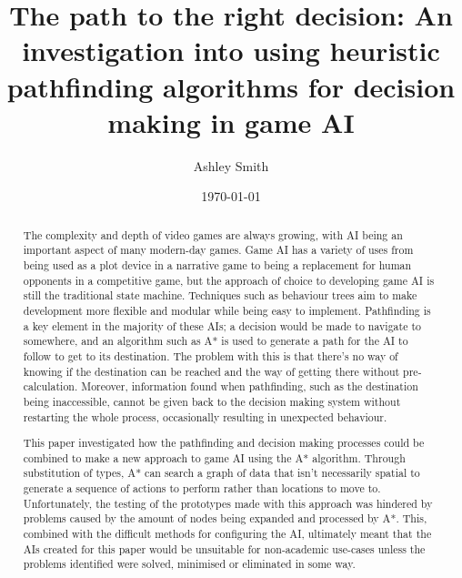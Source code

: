 \documentclass[11pt, a4paper]{report}
\begin{document}
\title{\titlefont The path to the right decision: An investigation into using heuristic pathfinding algorithms for decision making in game AI}
\author{Ashley Smith}
\date{\today}
\maketitle
\thispagestyle{empty}

\renewcommand\abstractname{\textbf{Abstract}}
\begin{abstract}
The complexity and depth of video games are always growing, with AI being an important aspect of many modern-day games. Game AI has a variety of uses from being used as a plot device in a narrative game to being a replacement for human opponents in a competitive game, but the approach of choice to developing game AI is still the traditional state machine. Techniques such as behaviour trees aim to make development more flexible and modular while being easy to implement. Pathfinding is a key element in the majority of these AIs; a decision would be made to navigate to somewhere, and an algorithm such as A* is used to generate a path for the AI to follow to get to its destination. The problem with this is that there's no way of knowing if the destination can be reached and the way of getting there without pre-calculation. Moreover, information found when pathfinding, such as the destination being inaccessible, cannot be given back to the decision making system without restarting the whole process, occasionally resulting in unexpected behaviour. 

This paper investigated how the pathfinding and decision making processes could be combined to make a new approach to game AI using the A* algorithm. Through substitution of types, A* can search a graph of data that isn't necessarily spatial to generate a sequence of actions to perform rather than locations to move to. Unfortunately, the testing of the prototypes made with this approach was hindered by problems caused by the amount of nodes being expanded and processed by A*. This, combined with the difficult methods for configuring the AI, ultimately meant that the AIs created for this paper would be unsuitable for non-academic use-cases unless the problems identified were solved, minimised or eliminated in some way.
\end{abstract}

\cleardoublepage
\setcounter{page}{1}
\tableofcontents

\cleardoublepage
{}
\setcounter{page}{1}
\end{document}
